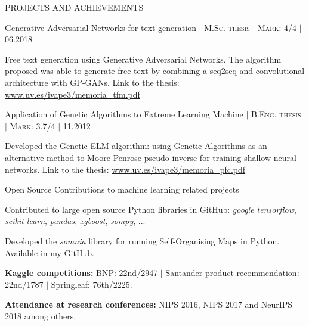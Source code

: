 \documentclass{resume} %
\begin{document}

\begin{rSection}{PROJECTS AND ACHIEVEMENTS}

\begin{rSubsection}{Generative Adversarial Networks for text generation  $|$  \textnormal{\textsc{M.Sc. thesis  $|$  Mark: 4/4}} $|$ \textnormal{06.2018}}{}{}{}  %

\vspace{-3pt}

\item Free text generation using Generative Adversarial Networks. The algorithm proposed was able to generate free text by combining a seq2seq and convolutional architecture with GP-GANs. Link to the thesis: \href{https://www.uv.es/ivape3/memoria_tfm.pdf}{www.uv.es/ivape3/memoria\_tfm.pdf}

\end{rSubsection}

\vspace{-6pt}

\begin{rSubsection}{Application of Genetic Algorithms to Extreme Learning Machine  $|$  \textnormal{\textsc{B.Eng. thesis  $|$  Mark: 3.7/4}} $|$ \textnormal{11.2012}}
{}{}{}

\vspace{-3pt}

\item Developed the Genetic ELM algorithm: using Genetic Algorithms as an alternative method to Moore-Penrose pseudo-inverse for training shallow neural networks. Link to the thesis: \href{https://www.uv.es/ivape3/memoria_pfc.pdf}{www.uv.es/ivape3/memoria\_pfc.pdf}

\end{rSubsection}

\vspace{-6pt}

\begin{rSubsection}{Open Source Contributions to machine learning related projects}
	{}{}{}

	\vspace{-3pt}

	\item Contributed to large open source Python libraries in GitHub: \textit{google tensorflow}, \textit{scikit-learn}, \textit{pandas}, \textit{xgboost}, \textit{sompy}, ...
	\item Developed the \textit{somnia} library for running Self-Organising Maps in Python. Available in my GitHub.
\end{rSubsection}

\vspace{-6pt}

\textbf{Kaggle competitions:} BNP: 22nd/2947 $|$ Santander product recommendation: 22nd/1787 $|$ Springleaf: 76th/2225.

\vspace{-6pt}

\textbf{Attendance at research conferences:} NIPS 2016, NIPS 2017 and NeurIPS 2018 among others.


\end{rSection}
\end{document}
